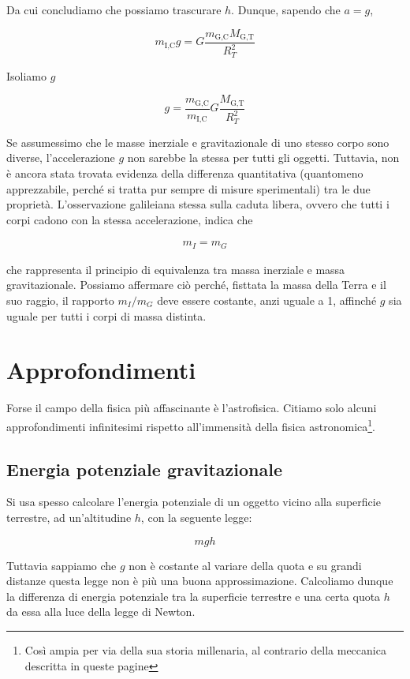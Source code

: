 \noindent Da cui concludiamo che possiamo trascurare $h$. Dunque, sapendo che
$a = g$,

\[ m_\text{I,C}g = G\frac{m_\text{G,C}M_\text{G,T}}{R_{T}^2} \]

\noindent Isoliamo $g$

\[ g = \frac{m_\text{G,C}}{m_\text{I,C}}G\frac{M_\text{G,T}}{R_{T}^2} \]

\noindent Se assumessimo che le masse inerziale e gravitazionale di uno stesso corpo
sono diverse, l'accelerazione $g$ non sarebbe la stessa per tutti gli oggetti. Tuttavia,
non è ancora stata trovata evidenza della differenza quantitativa (quantomeno apprezzabile,
perché si tratta pur sempre di misure sperimentali) tra le due proprietà. L'osservazione galileiana stessa
sulla caduta libera, ovvero che tutti i corpi cadono con la stessa accelerazione,
indica che

\begin{align}
    m_I = m_G\label{equivalence}
\end{align}

\noindent che rappresenta il principio di equivalenza tra massa inerziale e massa
gravitazionale. Possiamo affermare ciò perché,
fisttata la massa della Terra e il suo raggio,
il rapporto $m_I/m_G$ deve essere costante, anzi uguale a 1,
affinché $g$ sia uguale per tutti i corpi di massa distinta.

\section{Approfondimenti}
Forse il campo della fisica più affascinante è
l'astrofisica. Citiamo solo alcuni approfondimenti infinitesimi rispetto
all'immensità della fisica astronomica\footnote{Così ampia per via della
sua storia millenaria, al contrario della meccanica descritta in queste
pagine}.

\subsection{Energia potenziale gravitazionale}
Si usa spesso calcolare l'energia potenziale di un oggetto vicino alla superficie
terrestre, ad un'altitudine $h$, con la seguente legge:

\[ mgh \]

\noindent Tuttavia sappiamo che $g$ non è costante al variare della quota e su grandi
distanze questa legge non è più una buona approssimazione. Calcoliamo dunque la differenza
di energia potenziale tra la superficie terrestre e una certa quota $h$ da essa alla luce
della legge di Newton.

